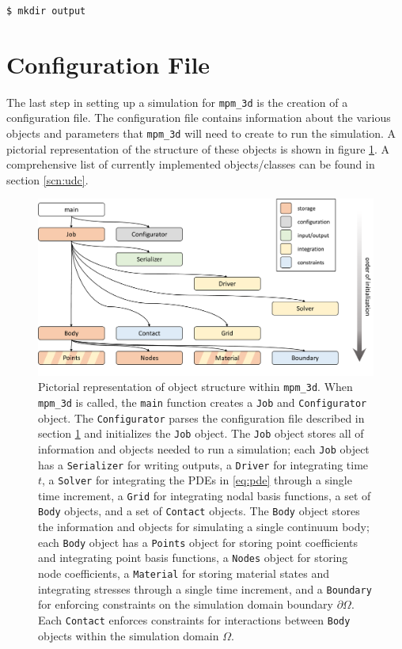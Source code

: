 \texttt{\$ mkdir output}


\section{Configuration File} \label{scn:config_file}
The last step in setting up a simulation for \texttt{mpm\_3d} is the creation of a configuration file. The configuration file contains information about the various objects and parameters that \texttt{mpm\_3d} will need to create to run the simulation. A pictorial representation of the structure of these objects is shown in figure \ref{fig:code}. A comprehensive list of currently implemented objects/classes can be found in section \ref{scn:udc}.

\begin{figure}[!ht]
\centering
\includegraphics[scale=0.5]{images/CodeDiagram.pdf}
\caption{Pictorial representation of object structure within \texttt{mpm\_3d}. When \texttt{mpm\_3d} is called, the \texttt{main} function creates a \texttt{Job} and \texttt{Configurator} object. The \texttt{Configurator} parses the configuration file described in section \ref{scn:config_file} and initializes the \texttt{Job} object. The \texttt{Job} object stores all of information and objects needed to run a simulation; each \texttt{Job} object has a \texttt{Serializer} for writing outputs, a \texttt{Driver} for integrating time $t$, a \texttt{Solver} for integrating the PDEs in \eqref{eq:pde} through a single time increment, a \texttt{Grid} for integrating nodal basis functions, a set of \texttt{Body} objects, and a set of \texttt{Contact} objects. The \texttt{Body} object stores the information and objects for simulating a single continuum body; each \texttt{Body} object has a \texttt{Points} object for storing point coefficients and integrating point basis functions, a \texttt{Nodes} object for storing node coefficients, a \texttt{Material} for storing material states and integrating stresses through a single time increment, and a \texttt{Boundary} for enforcing constraints on the simulation domain boundary $\partial \Omega$. Each \texttt{Contact} enforces constraints for interactions between \texttt{Body} objects within the simulation domain $\Omega$.} \label{fig:code}
\end{figure}

